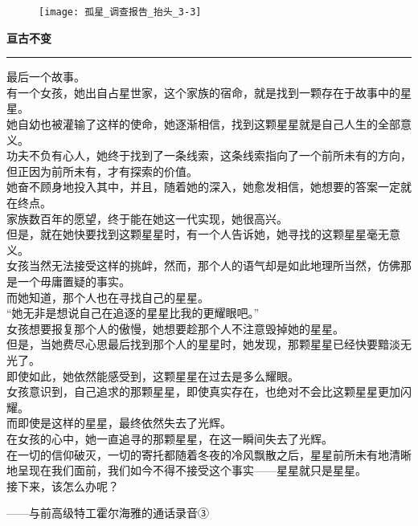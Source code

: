 \documentclass[openany]{book}
\begin{document}
\begin{figure}[h]
    \centering
    \texttt{[image: 孤星\_调查报告\_抬头\_3-3]}
\end{figure}
{\Large\textbf{亘古不变}}\par\noindent\rule{\textwidth}{0.4pt}
最后一个故事。\\
有一个女孩，她出自占星世家，这个家族的宿命，就是找到一颗存在于故事中的星星。\\
她自幼也被灌输了这样的使命，她逐渐相信，找到这颗星星就是自己人生的全部意义。\\
功夫不负有心人，她终于找到了一条线索，这条线索指向了一个前所未有的方向，但正因为前所未有，才有探索的价值。\\
她奋不顾身地投入其中，并且，随着她的深入，她愈发相信，她想要的答案一定就在终点。\\
家族数百年的愿望，终于能在她这一代实现，她很高兴。\\
但是，就在她快要找到这颗星星时，有一个人告诉她，她寻找的这颗星星毫无意义。\\
女孩当然无法接受这样的挑衅，然而，那个人的语气却是如此地理所当然，仿佛那是一个毋庸置疑的事实。\\
而她知道，那个人也在寻找自己的星星。\\
“她无非是想说自己在追逐的星星比我的更耀眼吧。”\\
女孩想要报复那个人的傲慢，她想要趁那个人不注意毁掉她的星星。\\
但是，当她费尽心思最后找到那个人的星星时，她发现，那颗星星已经快要黯淡无光了。\\
即使如此，她依然能感受到，这颗星星在过去是多么耀眼。\\
女孩意识到，自己追求的那颗星星，即使真实存在，也绝对不会比这颗星星更加闪耀。\\
而即使是这样的星星，最终依然失去了光辉。\\
在女孩的心中，她一直追寻的那颗星星，在这一瞬间失去了光辉。\\
在一切的信仰破灭，一切的寄托都随着冬夜的冷风飘散之后，星星前所未有地清晰地呈现在我们面前，我们如今不得不接受这个事实——星星就只是星星。\\
接下来，该怎么办呢？\\
\begin{flushright}——与前高级特工霍尔海雅的通话录音③\end{flushright}
\clearpage
\end{document}
